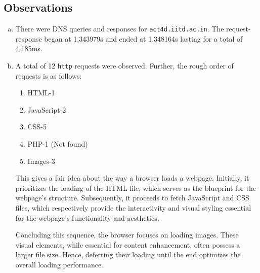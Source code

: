 \subsection*{Observations}
\begin{enumerate}[a. ]
    \item There were DNS queries and responses for {\tt act4d.iitd.ac.in}. The request-response began at 1.343979s and ended at 1.348164s lasting for a total of 4.185ms.
    \item A total of 12 {\tt http} requests were observed. Further, the rough order of requests is as follows:
        \begin{enumerate}
            \item HTML-1
            \item JavaScript-2
            \item CSS-5
            \item PHP-1 (Not found)
            \item Images-3
        \end{enumerate}
        This gives a fair idea about the way a browser loads a webpage. Initially, it prioritizes the loading of the HTML file, which serves as the blueprint for the webpage's structure. Subsequently, it proceeds to fetch JavaScript and CSS files, which respectively provide the interactivity and visual styling essential for the webpage's functionality and aesthetics.

        Concluding this sequence, the browser focuses on loading images. These visual elements, while essential for content enhancement, often possess a larger file size. Hence, deferring their loading until the end optimizes the overall loading performance.


\end{enumerate}
